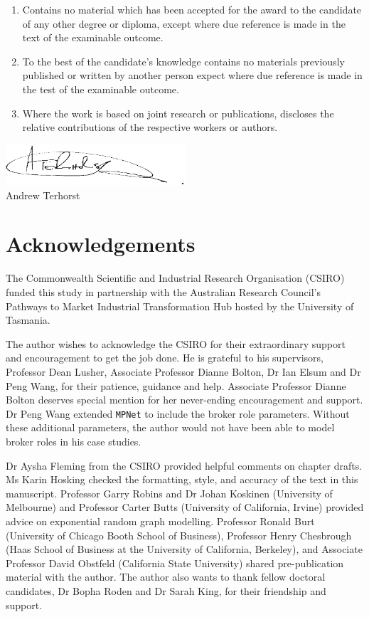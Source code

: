 \documentclass[12pt,table,xcdraw]{book}
\renewcommand{\today}{\the\day \ \monthname \ \the\year}
\begin{document}
\begin{enumerate}
    \item Contains no material which has been accepted for the award to the candidate of any other degree or diploma, except where due reference is made in the text of the examinable outcome.
    \item To the best of the candidate’s knowledge contains no materials previously published or written by another person expect where due reference is made in the test of the examinable outcome.
    \item Where the work is based on joint research or publications, discloses the relative contributions of the respective workers or authors.
\end{enumerate} \bigskip

\includegraphics[width = 0.5\textwidth]{Images/Signature.png}\\
Andrew Terhorst\\
\shortdate{\today}

\chapter*{Acknowledgements}

The Commonwealth Scientific and Industrial Research Organisation (CSIRO) funded this study in partnership with the Australian Research Council's Pathways to Market Industrial Transformation Hub hosted by the University of Tasmania. \medskip

The author wishes to acknowledge the CSIRO for their extraordinary support and encouragement to get the job done. He is grateful to his supervisors, Professor Dean Lusher, Associate Professor Dianne Bolton, Dr Ian Elsum and Dr Peng Wang, for their patience, guidance and help. Associate Professor Dianne Bolton deserves special mention for her never-ending encouragement and support. Dr Peng Wang extended \texttt{MPNet} to include the \citet{gould1989structures} broker role parameters. Without these additional parameters, the author would not have been able to model broker roles in his case studies. \medskip

Dr Aysha Fleming from the CSIRO provided helpful comments on chapter drafts. Ms Karin Hosking checked the formatting, style, and accuracy of the text in this manuscript. Professor Garry Robins and Dr Johan Koskinen (University of Melbourne) and Professor Carter Butts (University of California, Irvine) provided advice on exponential random graph modelling. Professor Ronald Burt (University of Chicago Booth School of Business), Professor Henry Chesbrough (Haas School of Business at the University of California, Berkeley), and Associate Professor David Obstfeld (California State University) shared pre-publication material with the author. The author also wants to thank fellow doctoral candidates, Dr Bopha Roden and Dr Sarah King, for their friendship and support. \medskip
\end{document}
